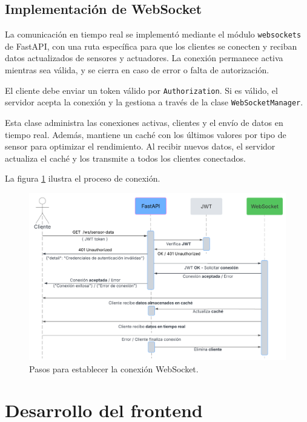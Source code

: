 \subsection{Implementación de WebSocket}

La comunicación en tiempo real se implementó mediante el módulo
\texttt{websockets} de FastAPI, con una ruta específica para que los clientes
se conecten y reciban datos actualizados de sensores y actuadores. La conexión
permanece activa mientras sea válida, y se cierra en caso de error o falta de
autorización.

El cliente debe enviar un token válido por \texttt{Authorization}. Si es
válido, el servidor acepta la conexión y la gestiona a través de la clase
\texttt{WebSocketManager}.

Esta clase administra las conexiones activas, clientes y el envío de datos en
tiempo real. Además, mantiene un caché con los últimos valores por tipo de
sensor para optimizar el rendimiento. Al recibir nuevos datos, el servidor
actualiza el caché y los transmite a todos los clientes conectados.

La figura \ref{fig:websocket} ilustra el proceso de conexión.

\begin{figure}[H]
    \centering
    \includegraphics[width=.90\textwidth]{./Images/23.png}
    \caption{Pasos para establecer la conexión WebSocket.}
    \label{fig:websocket}
\end{figure}

\section{Desarrollo del frontend}


